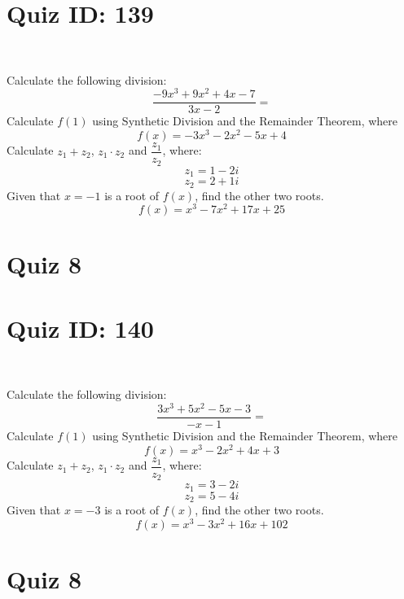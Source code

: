 \documentclass{exam}
\begin{document}
\section*{Quiz ID: 139}
\vspace{0.5cm}\
\vspace{1cm}\
\begin{questions}
\question Calculate the following division:\[\dfrac{
-9x^3 + 9x^2 + 4x - 7}{
3x - 2}=\] \makeemptybox{\stretch{2}}
\question Calculate $f(1)$ using Synthetic Division and the Remainder Theorem, where\[f(x) = 
-3x^3 - 2x^2 - 5x + 4\]
\newpage\question Calculate $z_1+z_2$, $z_1\cdot z_2$ and $\dfrac{z_1}{z_2}$, where:\[z_1=1-2\mathit{i}\]\[z_2=2+1\mathit{i}\]
\question Given that $x=-1$ is a root of $f(x)$, find the other two roots.\[f(x)=
x^3 - 7x^2 + 17x + 25\]\makeemptybox{\stretch{1}}
\end{questions}\newpage
\newpage
\section*{Quiz 8}
\section*{Quiz ID: 140}
\vspace{0.5cm}\
\vspace{1cm}\
\begin{questions}
\question Calculate the following division:\[\dfrac{
3x^3 + 5x^2 - 5x - 3}{
-x - 1}=\] 
\question Calculate $f(1)$ using Synthetic Division and the Remainder Theorem, where\[f(x) = 
x^3 - 2x^2 + 4x + 3\]
\newpage\question Calculate $z_1+z_2$, $z_1\cdot z_2$ and $\dfrac{z_1}{z_2}$, where:\[z_1=3-2\mathit{i}\]\[z_2=5-4\mathit{i}\]\makeemptybox{\stretch{1}}
\question Given that $x=-3$ is a root of $f(x)$, find the other two roots.\[f(x)=
x^3 - 3x^2 + 16x + 102\]\makeemptybox{\stretch{1}}
\end{questions}\newpage
\newpage
\section*{Quiz 8}
\end{document}
